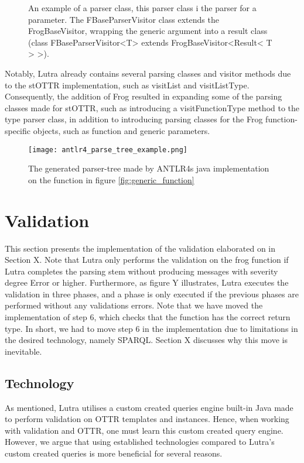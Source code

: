 \begin{figure}
  \begin{example}
      \label{parameterParser}
      An example of a parser class, this parser class i the parser for a parameter. The FBaseParserVisitor class extends the FrogBaseVisitor, wrapping the generic argument into a result class (class FBaseParserVisitor<T> extends FrogBaseVisitor<Result< T > >).  
  \end{example}
  
\end{figure}

\para
Notably, Lutra already contains several parsing classes and visitor methods due to the stOTTR implementation, such as visitList and visitListType. Consequently, the addition of Frog resulted in expanding some of the parsing classes made for stOTTR, such as introducing a visitFunctionType method to the type parser class, in addition to introducing parsing classes for the Frog function-specific objects, such as function and generic parameters. 


\begin{figure}
  \centering
  \texttt{[image: antlr4\_parse\_tree\_example.png]}
  \caption{The generated parser-tree made by ANTLR4s java implementation on the function in figure \ref{fig:generic_function}}
  \label{fig:parse_tree_example}
\end{figure}

\section{Validation}
\label{implValidation}
This section presents the implementation of the validation elaborated on in Section X. Note that Lutra only performs the validation on the frog function if Lutra completes the parsing stem without producing messages with severity degree Error or higher. Furthermore, as figure Y illustrates, Lutra executes the validation in three phases, and a phase is only executed if the previous phases are performed without any validations errors. Note that we have moved the implementation of step 6, which checks that the function has the correct return type. In short, we had to move step 6 in the implementation due to limitations in the desired technology, namely SPARQL. Section X discusses why this move is inevitable.

\subsection{Technology}
As mentioned, Lutra utilises a custom created queries engine built-in Java made to perform validation on OTTR templates and instances. Hence, when working with validation and OTTR, one must learn this custom created query engine. However, we argue that using established technologies compared to Lutra's custom created queries is more beneficial for several reasons. 


